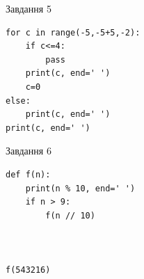 \documentclass[12pt, ukrainian]{article}
\begin{document}
{\vspace{15mm}
\begin{minipage}[t]{9.7cm}                
{\begin{center}Завдання {5}\end{center}}
\begin{verbatim}
for c in range(-5,-5+5,-2):
    if c<=4:
        pass
    print(c, end=' ')
    c=0
else:
    print(c, end=' ')
print(c, end=' ')
\end{verbatim}     
\end{minipage}
\vline \hspace{8mm}
\begin{minipage}[t]{8.0cm}                
{\begin{center}Завдання {6}\end{center}}
\begin{verbatim}
def f(n):
    print(n % 10, end=' ')
    if n > 9:
        f(n // 10)
    


f(543216)
\end{verbatim}     
\end{minipage}

}
\newpage
\end{document}

